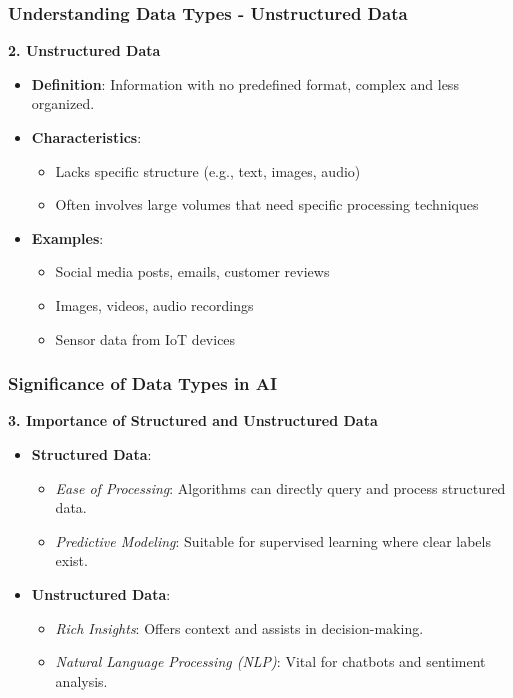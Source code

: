 \documentclass[aspectratio=169]{beamer}
\begin{document}
\begin{frame}[fragile]
    \frametitle{Understanding Data Types - Unstructured Data}
    \textbf{2. Unstructured Data}
    \begin{itemize}
        \item \textbf{Definition}: Information with no predefined format, complex and less organized.
        \item \textbf{Characteristics}:
        \begin{itemize}
            \item Lacks specific structure (e.g., text, images, audio)
            \item Often involves large volumes that need specific processing techniques
        \end{itemize}
        \item \textbf{Examples}:
        \begin{itemize}
            \item Social media posts, emails, customer reviews
            \item Images, videos, audio recordings
            \item Sensor data from IoT devices
        \end{itemize}
    \end{itemize}
\end{frame}

\begin{frame}[fragile]
    \frametitle{Significance of Data Types in AI}
    \textbf{3. Importance of Structured and Unstructured Data}
    \begin{itemize}
        \item \textbf{Structured Data}:
        \begin{itemize}
            \item \textit{Ease of Processing}: Algorithms can directly query and process structured data.
            \item \textit{Predictive Modeling}: Suitable for supervised learning where clear labels exist.
        \end{itemize}
        \item \textbf{Unstructured Data}:
        \begin{itemize}
            \item \textit{Rich Insights}: Offers context and assists in decision-making.
            \item \textit{Natural Language Processing (NLP)}: Vital for chatbots and sentiment analysis.
        \end{itemize}
    \end{itemize}
\end{frame}
\end{document}
